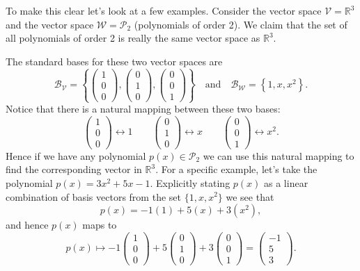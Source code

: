 To make this clear let's look at a few examples.  Consider the vector space $\mathcal{V} =
\mathbb{R}^3$ and the vector space $\mathcal{W} = \mathcal{P}_2$ (polynomials of order 2).
We claim that the set of all polynomials of order 2 is really the same vector space as
$\mathbb{R}^3$.

The standard bases for these two vector spaces are
\[ \mathcal{B}_{\mathcal{V}} = \left\{ \begin{pmatrix} 1\\0\\0\end{pmatrix},
    \begin{pmatrix} 0\\1\\0\end{pmatrix}, \begin{pmatrix}0\\0\\1\end{pmatrix} \right\}
    \quad \text{and} \quad \mathcal{B}_{\mathcal{W}} = \left\{ 1,x,x^2 \right\}. \]
Notice that there is a natural mapping between these two bases:
\[ \begin{pmatrix} 1\\0\\0\end{pmatrix} \leftrightarrow 1 \qquad
    \begin{pmatrix}0\\1\\0\end{pmatrix} \leftrightarrow x \qquad
\begin{pmatrix}0\\0\\1\end{pmatrix} \leftrightarrow x^2. \]
Hence if we have any polynomial $p(x) \in \mathcal{P}_2$ we can use this natural mapping
to find the corresponding vector in $\mathbb{R}^3$.  For a specific example, let's take
the polynomial $p(x) = 3x^2 + 5x - 1$.  Explicitly stating $p(x)$ as a linear combination
of basis vectors from the set $\{1,x,x^2\}$ we see that 
\[ p(x) = -1 (1) + 5(x) + 3(x^2), \]
and hence $p(x)$ maps to
\[ p(x) \mapsto -1 \begin{pmatrix}1\\0\\0\end{pmatrix} + 5
\begin{pmatrix}0\\1\\0\end{pmatrix} + 3 \begin{pmatrix}0\\0\\1\end{pmatrix} =
\begin{pmatrix} -1 \\ 5 \\ 3 \end{pmatrix}. \]
